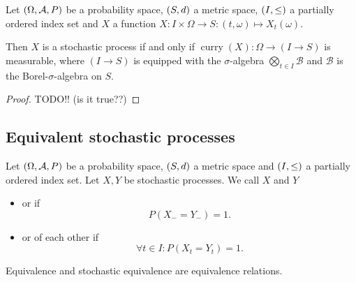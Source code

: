 \begin{lemma}
Let $\sSet{\Omega, \mathcal{A}, P}$ be a probability space, $\sSet{S,d}$ a metric space, $\sSet{I,\leq}$ a partially ordered index set and $X$ a function $X: I\times \Omega\to S: (t,\omega) \mapsto X_t(\omega)$.

Then $X$ is a stochastic process \textup{if and only if} $\operatorname{curry}(X): \Omega \to (I\to S)$ is measurable, where $(I\to S)$ is equipped with the $\sigma$-algebra $\bigotimes_{t\in I}\mathcal{B}$ and $\mathcal{B}$ is the Borel-$\sigma$-algebra on $S$.
\end{lemma}
\begin{proof}
TODO!! (is it true??)
\end{proof}

\subsection{Equivalent stochastic processes}
\begin{definition}
Let $\sSet{\Omega, \mathcal{A}, P}$ be a probability space, $\sSet{S,d}$ a metric space and $\sSet{I,\leq}$ a partially ordered index set. Let $X,Y$ be stochastic processes. We call $X$ and $Y$
\begin{itemize}
\item {} or  if
\[ P(X_- = Y_-) = 1. \]
\item {} or  of each other if
\[ \forall t\in I: P(X_t = Y_t) = 1.  \]
\end{itemize}
\end{definition}

\begin{lemma}
Equivalence and stochastic equivalence are equivalence relations.
\end{lemma}

